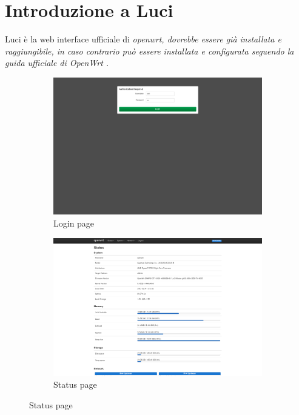 \section{Introduzione a Luci}

Luci è la web interface ufficiale di \it{openwrt}, dovrebbe essere già installata e raggiungibile, in caso contrario può essere installata e configurata seguendo la guida ufficiale di \it{OpenWrt} \cite{install-luci}.

\begin{figure}[H]
    \centering

    \begin{subfigure}{0.5\textwidth}
        \centering
        \includegraphics[height=0.65\linewidth]{immagini/LuCI_login}
        \caption{Login page}
        \label{fig:luci-login}
    \end{subfigure}%
    \hfill
    \begin{subfigure}{0.5\textwidth}
        \centering
        \includegraphics[height=0.65\linewidth]{immagini/LuCI_status}
        \caption{Status page}
        \label{fig:luci-status}
    \end{subfigure}%


\end{figure}
